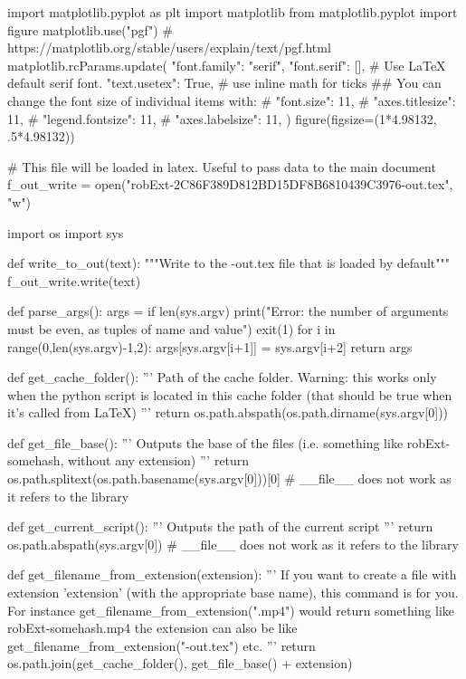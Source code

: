 import matplotlib.pyplot as plt
import matplotlib
from matplotlib.pyplot import figure
matplotlib.use("pgf")
# https://matplotlib.org/stable/users/explain/text/pgf.html
matplotlib.rcParams.update({
  "font.family": "serif",
  "font.serif": [], # Use LaTeX default serif font.
  "text.usetex": True, # use inline math for ticks
  ## You can change the font size of individual items with:
  # "font.size": 11,
  # "axes.titlesize": 11,
  # "legend.fontsize": 11,
  # "axes.labelsize": 11,
})
figure(figsize=(1*4.98132, .5*4.98132))



# This file will be loaded in latex. Useful to pass data to the main document
f_out_write = open("robExt-2C86F389D812BD15DF8B6810439C3976-out.tex", "w")

import os
import sys

def write_to_out(text):
    """Write to the -out.tex file that is loaded by default"""
    f_out_write.write(text)

def parse_args():
    args = {}
    if len(sys.argv) %
        print("Error: the number of arguments must be even, as tuples of name and value")
        exit(1)
    for i in range(0,len(sys.argv)-1,2):
        args[sys.argv[i+1]] = sys.argv[i+2]
    return args

def get_cache_folder():
    '''
    Path of the cache folder. Warning: this works only when the python script
    is located in this cache folder (that should be true when it's called from LaTeX)
    '''
    return os.path.abspath(os.path.dirname(sys.argv[0]))

def get_file_base():
    '''
    Outputs the base of the files (i.e. something like robExt-somehash, without any extension)
    '''
    return os.path.splitext(os.path.basename(sys.argv[0]))[0] # __file__ does not work as it refers to the library

def get_current_script():
    '''
    Outputs the path of the current script
    '''
    return os.path.abspath(sys.argv[0]) # __file__ does not work as it refers to the library


def get_filename_from_extension(extension):
    '''
    If you want to create a file with extension 'extension' (with the appropriate base name), this command
    is for you. For instance get_filename_from_extension(".mp4") would return something like
    robExt-somehash.mp4
    the extension can also be like get_filename_from_extension("-out.tex") etc.
    '''
    return os.path.join(get_cache_folder(), get_file_base() + extension)

